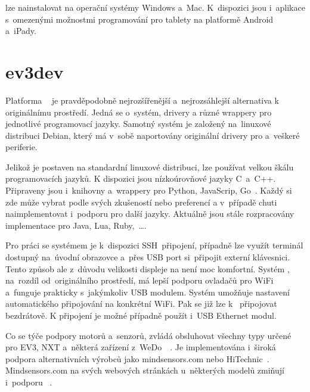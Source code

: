 \legoSW{} lze nainstalovat na operační systémy Windows a~Mac. K~dispozici jsou i~aplikace s~omezenými možnostmi programování pro tablety na platformě Android a~iPady.


\section{ev3dev}
\label{lego-ev3dev}

Platforma \evThreeDev{}~\cite{legoMindstormsEV3_ev3dev} je pravděpodobně nejrozšířenější a~nejrozsáhlejší alternativa k originálnímu \lego{} prostředí.
Jedná se o~systém, drivery a různé wrappery pro jednotlivé programovací jazyky. 
Samotný systém je založený na~linuxové distribuci Debian, který má v~sobě naportovány originální \lego{} drivery pro \EVbrick{} a~veškeré periferie.

Jelikož je \evThreeDev{} postaven na standardní linuxové distribuci, lze používat velkou škálu programovacích jazyků. 
K dispozici jsou nízkoúrovňové jazyky C~a~C++. 
Připraveny jsou i~knihovny a~wrappery pro Python, JavaScrip, Go~\cite{legoMindstormsEV3_ev3dev-prog-lang}. 
Každý si zde může vybrat podle svých zkušeností nebo preferencí a v~případě chuti naimplementovat i~podporu pro další jazyky. 
Aktuálně jsou stále rozpracovány implementace pro Java, Lua, Ruby,~\dots{}.

Pro práci se systémem je k~dispozici SSH~připojení, případně lze využít terminál dostupný na~úvodní obrazovce a~přes USB port si~připojit externí klávesnici. 
Tento způsob ale z~důvodu velikosti displeje na  není moc komfortní. 
Systém \evThreeDev{}, na~rozdíl od~originálního \lego{} prostředí, má lepší podporu ovladačů pro WiFi a~funguje prakticky s~jakýmkoliv USB modulem. 
Systém umožňuje nastavení automatického připojování na konkrétní WiFi. Pak se již lze k~ připojovat bezdrátově.
K připojení je možné případně použít i~USB Ethernet modul.
 
Co se týče podpory \lego{} motorů a~senzorů, \evThreeDev{} zvládá obsluhovat všechny typy určené pro EV3, NXT a~některá zařízení z~WeDo~\cite{legoMindstormsEV3_ev3dev-support-motors}~\cite{legoMindstormsEV3_ev3dev-support-sensors}.
Je implementována i~široká podpora alternativních výrobců jako mindsensors.com nebo HiTechnic~\cite{baichtal2016hacking}. 
Mindsensors.com na svých webových stránkách u~některých modelů zmiňují i~podporu \evThreeDev{}~\cite{lego_mindsensor_gyro}.  

